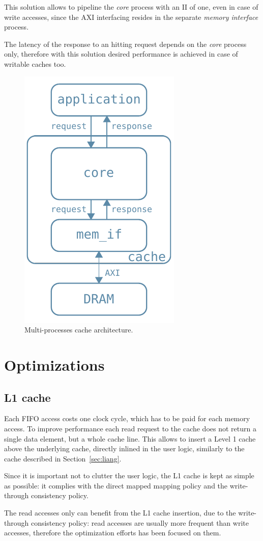 \documentclass[11pt,a4paper]{memoir}
\begin{document}
This solution allows to pipeline the \emph{core} process with an II of one, even
in case of write accesses, since the AXI interfacing resides in the separate
\emph{memory interface} process.

The latency of the response to an hitting request depends on the \emph{core}
process only, therefore with this solution desired performance is achieved in
case of writable caches too.

\begin{figure}
	\centering
	\includegraphics[width=.3\textwidth]{basic_arch_inner}
	\caption{Multi-processes cache architecture.}
	\label{fig:basic_arch_inner}
\end{figure}

\section{Optimizations}
\subsection{L1 cache}
Each FIFO access costs one clock cycle, which has to be paid for each memory
access. 
To improve performance each read request to the cache does not return a single
data element, but a whole cache line. This allows to insert a Level 1 cache
above the underlying cache, directly inlined in the user logic, similarly to
the cache described in Section~\ref{sec:liang}.

Since it is important not to clutter the user logic, the L1 cache is kept as
simple as possible: it complies with the direct mapped mapping policy and the
write-through consistency policy.

The read accesses only can benefit from the L1 cache insertion, due to the
write-through consistency policy: read accesses are usually more frequent than
write accesses, therefore the optimization efforts has been focused on them.
\end{document}
